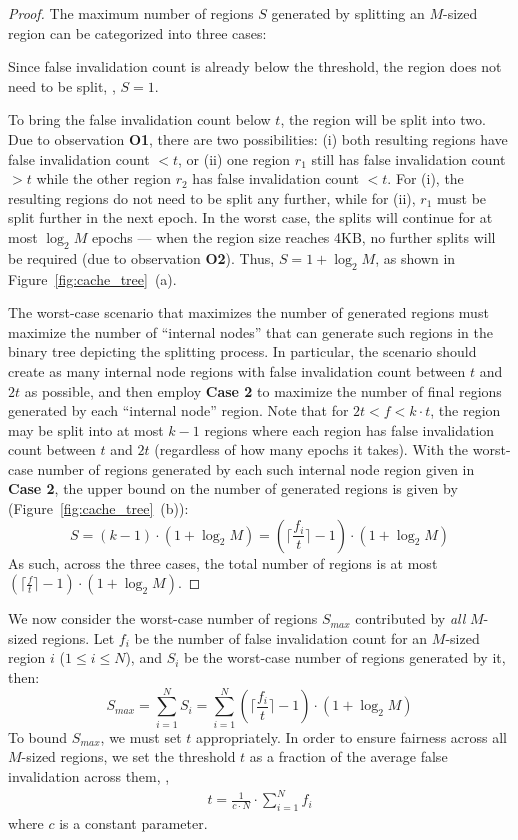 \begin{proof}
  \noindent
  The maximum number of regions $S$ generated by splitting an $M$-sized region can be categorized into three cases:
  
   Since false invalidation count is already below the threshold, the region does not need to be split, \ie, $S=1$.
  
   To bring the false invalidation count below $t$, the region will be split into two. Due to observation \textbf{O1}, there are two possibilities: (i) both resulting regions have false invalidation count $<t$, or (ii) one region $r_1$ still has false invalidation count $>t$ while the other region $r_2$ has false invalidation count $<t$. For (i), the resulting regions do not need to be split any further, while for (ii), $r_1$ must be split further in the next epoch. In the worst case, the splits will continue for at most $\log_2{M}$ epochs --- when the region size reaches 4KB, no further splits will be required (due to observation \textbf{O2}). Thus, $S = 1 + \log_2{M}$, as shown in Figure~\ref{fig:cache_tree}~(a).
  
   The worst-case scenario that maximizes the number of generated regions must maximize the number of ``internal nodes'' that can generate such regions in the binary tree depicting the splitting process. In particular, the scenario should create as many internal node regions with false invalidation count between $t$ and $2t$ as possible, and then employ \textbf{Case 2} to maximize the number of final regions generated by each ``internal node'' region. Note that for $2t < f < k\cdot t$, the region may be split into at most $k - 1$ regions where each region has false invalidation count between $t$ and $2t$ (regardless of how many epochs it takes). With the worst-case number of regions generated by each such internal node region given in \textbf{Case 2}, the upper bound on the number of generated regions is given by (Figure~\ref{fig:cache_tree}~(b)):
  $$S = (k - 1) \cdot (1 + \log_2{M}) = (\lceil\frac{f_i}{t}\rceil - 1) \cdot (1+\log_2{M})$$
  \noindent
  As such, across the three cases, the total number of regions is at most $(\lceil\frac{f}{t}\rceil - 1) \cdot (1+\log_2{M})$.
\end{proof}

 We now consider the worst-case number of regions $S_{max}$ contributed by \textit{all} $M$-sized regions. Let $f_i$ be the number of false invalidation count for an $M$-sized region $i$ ($1 \leq i \leq N$), and $S_i$ be the worst-case number of regions generated by it, then:
$$ S_{max} = \sum\limits_{i=1}^{N} S_i = \sum\limits_{i=1}^{N} (\lceil\frac{f_i}{t}\rceil - 1) \cdot (1+\log_2{M}) $$
\noindent
To bound $S_{max}$, we must set $t$ appropriately. In order to ensure fairness across all $M$-sized regions, we set the threshold $t$ as a fraction of the average false invalidation across them, \ie, 
\begin{align}\label{eq:t}
  t = \frac{1}{c\cdot N} \cdot \sum\limits_{i=1}^{N} f_i
\end{align}
\noindent
where $c$ is a constant parameter.

